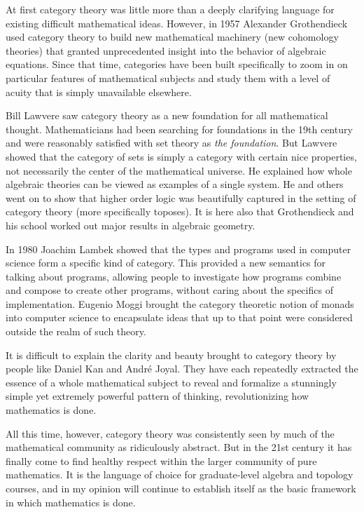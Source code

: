 \documentclass{book}
\theoremstyle{remark}
\theoremstyle{definition}
\begin{document}
At first category theory was little more than a deeply clarifying language for existing difficult mathematical ideas. However, in 1957 Alexander Grothendieck used category theory to build new mathematical machinery (new cohomology theories) that granted unprecedented insight into the behavior of algebraic equations. Since that time, categories have been built specifically to zoom in on particular features of mathematical subjects and study them with a level of acuity that is simply unavailable elsewhere.

Bill Lawvere saw category theory as a new foundation for all mathematical thought. Mathematicians had been searching for foundations in the 19th century and were reasonably satisfied with set theory as {\em the foundation}. But Lawvere showed that the category of sets is simply a category with certain nice properties, not necessarily the center of the mathematical universe. He explained how whole algebraic theories can be viewed as examples of a single system. He and others went on to show that higher order logic was beautifully captured in the setting of category theory (more specifically toposes). It is here also that Grothendieck and his school worked out major results in algebraic geometry. 

In 1980 Joachim Lambek showed that the types and programs used in computer science form a specific kind of category. This provided a new semantics for talking about programs, allowing people to investigate how programs combine and compose to create other programs, without caring about the specifics of implementation. Eugenio Moggi brought the category theoretic notion of monads into computer science to encapsulate ideas that up to that point were considered outside the realm of such theory.

It is difficult to explain the clarity and beauty brought to category theory by people like Daniel Kan and Andr\'{e} Joyal. They have each repeatedly extracted the essence of a whole mathematical subject to reveal and formalize a stunningly simple yet extremely powerful pattern of thinking, revolutionizing how mathematics is done. 

All this time, however, category theory was consistently seen by much of the mathematical community as ridiculously abstract. But in the 21st century it has finally come to find healthy respect within the larger community of pure mathematics. It is the language of choice for graduate-level algebra and topology courses, and in my opinion will continue to establish itself as the basic framework in which mathematics is done.
\end{document}
